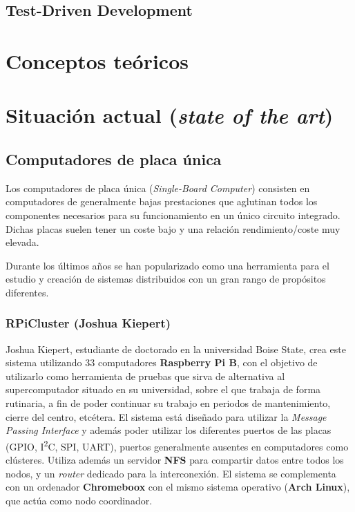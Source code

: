 \subsection{Test-Driven Development}

\section{Conceptos teóricos}

\section{Situación actual (\textit{state of the art})}


\subsection{Computadores de placa única}

Los computadores de placa única (\textit{Single-Board Computer}) consisten en computadores de generalmente bajas prestaciones que aglutinan todos los componentes necesarios para su funcionamiento en un único circuito integrado. Dichas placas suelen tener un coste bajo y una relación rendimiento/coste muy elevada.

Durante los últimos años se han popularizado como una herramienta para el estudio y creación de sistemas distribuidos con un gran rango de propósitos diferentes.

\subsubsection{RPiCluster (Joshua Kiepert)}

Joshua Kiepert, estudiante de doctorado en la universidad Boise State, crea este sistema utilizando 33 computadores \textbf{Raspberry Pi B}, con el objetivo de utilizarlo como herramienta de pruebas que sirva de alternativa al supercomputador situado en su universidad\cite{joshuarpicluster}, sobre el que trabaja de forma rutinaria, a fin de poder continuar su trabajo en periodos de mantenimiento, cierre del centro, etcétera. El sistema está diseñado para utilizar la \textit{Message Passing Interface} y además poder utilizar los diferentes puertos de las placas (GPIO, I\textsuperscript{2}C, SPI, UART), puertos generalmente ausentes en computadores como clústeres. Utiliza además un servidor \textbf{NFS} para compartir datos entre todos los nodos, y un \textit{router} dedicado para la interconexión. El sistema se complementa con un ordenador \textbf{Chromeboox} con el mismo sistema operativo (\textbf{Arch Linux}), que actúa como nodo coordinador.

